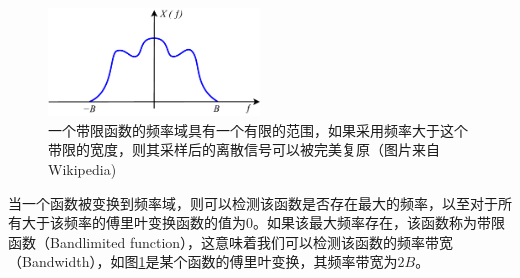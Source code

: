

\begin{figure}
\sidecaption
	\includegraphics[width=0.5\textwidth]{figures/intro/Bandlimited}
	\caption{一个带限函数的频率域具有一个有限的范围，如果采用频率大于这个带限的宽度，则其采样后的离散信号可以被完美复原（图片来自Wikipedia)}
	\label{f:intro-fourier-case}
\end{figure}


当一个函数被变换到频率域，则可以检测该函数是否存在最大的频率，以至对于所有大于该频率的傅里叶变换函数的值为$0$。如果该最大频率存在，该函数称为带限函数（Bandlimited function），这意味着我们可以检测该函数的频率带宽（Bandwidth），如图\ref{f:intro-fourier-case}是某个函数的傅里叶变换，其频率带宽为$2B$。


